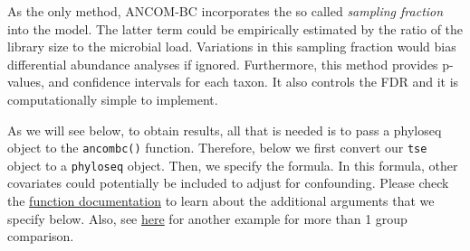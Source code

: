 \documentclass[
  oneside]{book}
\newenvironment{Shaded}{\begin{snugshade}}{\end{snugshade}}
\newcommand{\AttributeTok}[1]{\textcolor[rgb]{0.77,0.63,0.00}{#1}}
\newcommand{\CommentTok}[1]{\textcolor[rgb]{0.56,0.35,0.01}{\textit{#1}}}
\newcommand{\ConstantTok}[1]{\textcolor[rgb]{0.00,0.00,0.00}{#1}}
\newcommand{\DecValTok}[1]{\textcolor[rgb]{0.00,0.00,0.81}{#1}}
\newcommand{\FloatTok}[1]{\textcolor[rgb]{0.00,0.00,0.81}{#1}}
\newcommand{\FunctionTok}[1]{\textcolor[rgb]{0.00,0.00,0.00}{#1}}
\newcommand{\NormalTok}[1]{#1}
\newcommand{\OtherTok}[1]{\textcolor[rgb]{0.56,0.35,0.01}{#1}}
\newcommand{\SpecialCharTok}[1]{\textcolor[rgb]{0.00,0.00,0.00}{#1}}
\newcommand{\StringTok}[1]{\textcolor[rgb]{0.31,0.60,0.02}{#1}}
\begin{document}
As the only method, ANCOM-BC incorporates the so called \emph{sampling fraction} into the model. The latter term could be empirically estimated by the ratio of the library size to the microbial load. Variations in this sampling fraction would bias differential abundance analyses if ignored. Furthermore, this method provides p-values, and confidence intervals for each taxon.
It also controls the FDR and it is computationally simple to implement.

As we will see below, to obtain results, all that is needed is to pass
a phyloseq object to the \texttt{ancombc()} function. Therefore, below we first convert
our \texttt{tse} object to a \texttt{phyloseq} object. Then, we specify the formula. In this formula, other covariates could potentially be included to adjust for confounding.
Please check the \href{https://rdrr.io/github/FrederickHuangLin/ANCOMBC/man/ancombc.html}{function documentation}
to learn about the additional arguments that we specify below. Also, see \href{https://www.bioconductor.org/packages/release/bioc/vignettes/ANCOMBC/inst/doc/ANCOMBC.html}{here} for another example for more than 1 group comparison.

\begin{Shaded}
\end{Shaded}
\end{document}
